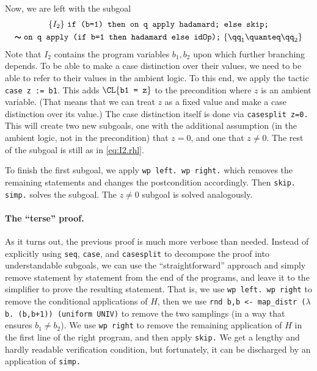 \documentclass{article}
\begin{document}
Now, we are left with the subgoal
\begin{multline}
  \{I_2\}\
  {\texttt{if (b=1) then on q apply hadamard; else skip;}} \\
  \pmb\sim
  {\texttt{on q apply (if b=1 then hadamard else idOp);}}
  \
  \{\qq_1\quanteq\qq_2\}
  \label{eq:I2.rhl}
\end{multline}
Note that $I_2$
contains the program variables $b_1,b_2$
upon which further branching depends. To be able to make a case
distinction over their values, we need to be able to refer to their
values in the ambient logic. To this end, we apply the tactic
\texttt{case z := b1}. This adds $\CL{\texttt{b1 = z}}$
to the precondition where $z$
is an ambient variable. (That means that we can treat $z$
as a fixed value and make a case distinction over its value.)  The
case distinction itself is done via \texttt{casesplit z=0.} This will
create two new subgoals, one with the additional assumption (in the
ambient logic, not in the precondition) that $z=0$,
and one that $z\neq 0$.
The rest of the subgoal is still as in \eqref{eq:I2.rhl}.

To finish the first subgoal, we apply \texttt{\frenchspacing wp left. wp right.}
which removes the remaining statements and changes the postcondition
accordingly. Then \texttt{\frenchspacing skip. simp.} solves the subgoal. The
$z\neq0$ subgoal is solved analogously.

\paragraph{The ``terse'' proof.} As it turns out, the previous proof
is much more verbose than needed. Instead of explicitly using
\texttt{seq}, \texttt{case}, and \texttt{casesplit} to decompose the
proof into understandable subgoals, we can use the ``straightforward''
approach and simply remove statement by statement from the end of the
programs, and leave it to the simplifier to prove the resulting
statement. That is, we use \texttt{wp left. wp right} to remove
the conditional applications of $H$,
then we use \texttt{\frenchspacing rnd b,b <- map\_distr ($\lambda$b. (b,b+1)) (uniform
  UNIV)} to remove the two samplings (in a way that ensures
$b_1\neq b_2$). We
use \texttt{wp right} to remove the remaining application of $H$
in the first line of the right program, and then apply \texttt{skip.}
We get a lengthy and hardly readable verification condition, but
fortunately, it can be discharged by an application of \texttt{simp.}
\end{document}
